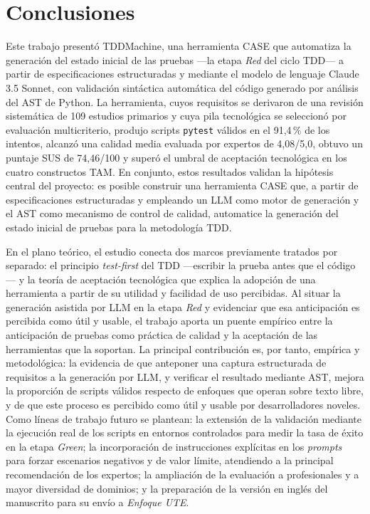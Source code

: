 \documentclass[10pt,journal,twoside,letterpaper]{IEEEtran}
\begin{document}
    \section{Conclusiones}
    \label{sec:conclusiones}
    
    Este trabajo presentó TDDMachine, una herramienta CASE que automatiza la generación del estado inicial de las pruebas ---la etapa \emph{Red} del ciclo TDD--- a partir de especificaciones estructuradas y mediante el modelo de lenguaje Claude 3.5 Sonnet, con validación sintáctica automática del código generado por análisis del AST de Python. La herramienta, cuyos requisitos se derivaron de una revisión sistemática de 109 estudios primarios y cuya pila tecnológica se seleccionó por evaluación multicriterio, produjo scripts \texttt{pytest} válidos en el 91,4\,\% de los intentos, alcanzó una calidad media evaluada por expertos de 4,08/5,0, obtuvo un puntaje SUS de 74,46/100 y superó el umbral de aceptación tecnológica en los cuatro constructos TAM. En conjunto, estos resultados validan la hipótesis central del proyecto: es posible construir una herramienta CASE que, a partir de especificaciones estructuradas y empleando un LLM como motor de generación y el AST como mecanismo de control de calidad, automatice la generación del estado inicial de pruebas para la metodología TDD.
    
    En el plano teórico, el estudio conecta dos marcos previamente tratados por separado: el principio \emph{test-first} del TDD ---escribir la prueba antes que el código--- y la teoría de aceptación tecnológica que explica la adopción de una herramienta a partir de su utilidad y facilidad de uso percibidas. Al situar la generación asistida por LLM en la etapa \emph{Red} y evidenciar que esa anticipación es percibida como útil y usable, el trabajo aporta un puente empírico entre la anticipación de pruebas como práctica de calidad y la aceptación de las herramientas que la soportan. La principal contribución es, por tanto, empírica y metodológica: la evidencia de que anteponer una captura estructurada de requisitos a la generación por LLM, y verificar el resultado mediante AST, mejora la proporción de scripts válidos respecto de enfoques que operan sobre texto libre, y de que este proceso es percibido como útil y usable por desarrolladores noveles. Como líneas de trabajo futuro se plantean: la extensión de la validación mediante la ejecución real de los scripts en entornos controlados para medir la tasa de éxito en la etapa \emph{Green}; la incorporación de instrucciones explícitas en los \emph{prompts} para forzar escenarios negativos y de valor límite, atendiendo a la principal recomendación de los expertos; la ampliación de la evaluación a profesionales y a mayor diversidad de dominios; y la preparación de la versión en inglés del manuscrito para su envío a \emph{Enfoque UTE}.
    
\end{document}

